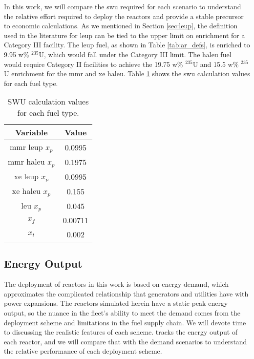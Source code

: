In this work, we will compare the \gls{swu} required for each scenario to understand the relative effort required to deploy the reactors and provide a stable precursor to economic calculations. As we mentioned in Section \ref{sec:leup}, the definition used in the literature for \gls{leup} can be tied to the upper limit on enrichment for a Category III facility. The \gls{leup} fuel, as shown in Table \ref{tab:ar_defs}, is enriched to 9.95 w\% $^{235}$U, which would fall under the Category III limit. The \gls{haleu} fuel would require Category II facilities to achieve the 19.75 w\% $^{235}$U and 15.5 w\% $^{235}$U enrichment for the \gls{mmr} and \gls{xe} \gls{haleu}. Table \ref{tab:swu_vals} shows the \gls{swu} calculation values for each fuel type.

\begin{table}[H]
    \centering
    \caption{SWU calculation values for each fuel type.}
    \label{tab:swu_vals}
    \begin{tabular}{c c}
        \hline
        \textbf{Variable} & \textbf{Value}\\
        \hline
        \gls{mmr} \gls{leup} $x_p$ & 0.0995\\
        \gls{mmr} \gls{haleu} $x_p$ & 0.1975\\
        \gls{xe} \gls{leup} $x_p$ & 0.0995\\
        \gls{xe} \gls{haleu} $x_p$ & 0.155\\
        \gls{leu} $x_p$ & 0.045\\
        $x_f$ & 0.00711\\
        $x_t$ & 0.002\\
        \hline
    \end{tabular}
\end{table}

\subsection{Energy Output}
\label{sec:energy_output}

The deployment of reactors in this work is based on energy demand, which
approximates the complicated relationship that generators and utilities
have with power expansions. The reactors simulated herein have a static peak energy output, so the nuance in the fleet's ability to meet the demand comes from the deployment scheme and limitations in the fuel supply chain. We will devote time to discussing the realistic features of each scheme. \cyclus tracks the energy output of each reactor, and we will compare that with the demand scenarios to understand the relative performance of each deployment scheme.


